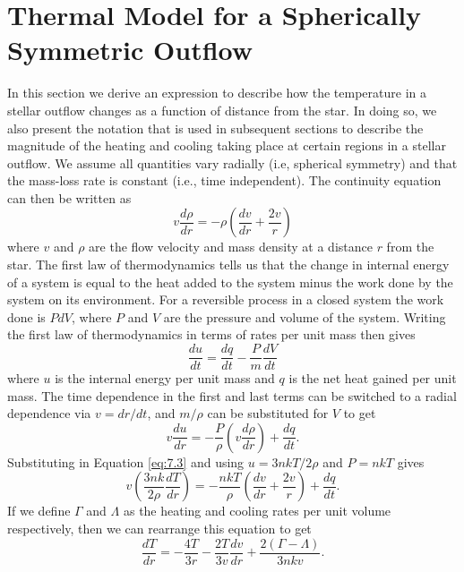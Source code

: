 \section{Thermal Model for a Spherically Symmetric Outflow}\label{sec:7.2}
In this section we derive an expression to describe how the temperature in a stellar outflow changes as a function of distance from the star. In doing so, we also present the notation that is used in subsequent sections to describe the magnitude of the heating and cooling taking place at certain regions in a stellar outflow. We assume all quantities vary radially (i.e, spherical symmetry) and that the mass-loss rate is constant (i.e., time independent). The continuity equation can then be written as
\begin{equation}
\label{eq:7.3}
v\frac{d\rho}{dr}=-\rho \left(\frac{dv}{dr}+\frac{2v}{r} \right)
\end{equation}
where $v$ and $\rho$ are the flow velocity and mass density at a distance $r$ from the star. The first law of thermodynamics tells us that the change in internal energy of a system is equal to the heat added to the system minus the work done by the system on its environment. For a reversible process in a closed system the work done is $PdV$, where $P$ and $V$ are the pressure and volume of the system. Writing the first law of thermodynamics in terms of rates per unit mass then gives
\begin{equation}
\frac{du}{dt}=\frac{dq}{dt}-\frac{P}{m}\frac{dV}{dt}
\end{equation}
where $u$ is the internal energy per unit mass and $q$ is the net heat gained per unit mass. The time dependence in the first and last terms can be switched to a radial dependence via $v=dr/dt$, and $m/\rho$ can be substituted for $V$ to get
\begin{equation}
v\frac{du}{dr}=-\frac{P}{\rho}\left(v\frac{d\rho}{dr} \right)+\frac{dq}{dt}.
\end{equation}
Substituting in Equation \ref{eq:7.3} and using $u=3nkT/2\rho$ and $P=nkT$ gives
\begin{equation}
v\left(\frac{3nk}{2\rho}\frac{dT}{dr}\right)=-\frac{nkT}{\rho}\left(\frac{dv}{dr} + \frac{2v}{r}\right) +\frac{dq}{dt}.
\end{equation}
If we define $\Gamma$ and $\Lambda$ as the heating and cooling rates per unit volume respectively, then we can rearrange this equation to get
\begin{equation}
\frac{dT}{dr}=-\frac{4T}{3r}-\frac{2T}{3v}\frac{dv}{dr}+\frac{2(\Gamma-\Lambda)}{3nkv}.
\end{equation}
